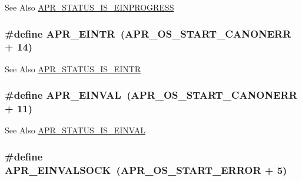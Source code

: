 \begin{DoxySeeAlso}{See Also}
\hyperlink{group___a_p_r___s_t_a_t_u_s___i_s_ga777e9ba36fe05ac8002113a9597073ea}{A\-P\-R\-\_\-\-S\-T\-A\-T\-U\-S\-\_\-\-I\-S\-\_\-\-E\-I\-N\-P\-R\-O\-G\-R\-E\-S\-S} 
\end{DoxySeeAlso}
\hypertarget{group___a_p_r___error_gaee1ce306c0ebf1701b34172310aa1bd5}{
\subsubsection[{A\-P\-R\-\_\-\-E\-I\-N\-T\-R}]{\setlength{\rightskip}{0pt plus 5cm}\#define A\-P\-R\-\_\-\-E\-I\-N\-T\-R~({\bf A\-P\-R\-\_\-\-O\-S\-\_\-\-S\-T\-A\-R\-T\-\_\-\-C\-A\-N\-O\-N\-E\-R\-R} + 14)}}\label{group___a_p_r___error_gaee1ce306c0ebf1701b34172310aa1bd5}
\begin{DoxySeeAlso}{See Also}
\hyperlink{group___a_p_r___s_t_a_t_u_s___i_s_ga30615baf6479221e44870c620e372b5b}{A\-P\-R\-\_\-\-S\-T\-A\-T\-U\-S\-\_\-\-I\-S\-\_\-\-E\-I\-N\-T\-R} 
\end{DoxySeeAlso}
\hypertarget{group___a_p_r___error_gae3ffc41994444e71ce522c036ca1d9a4}{
\subsubsection[{A\-P\-R\-\_\-\-E\-I\-N\-V\-A\-L}]{\setlength{\rightskip}{0pt plus 5cm}\#define A\-P\-R\-\_\-\-E\-I\-N\-V\-A\-L~({\bf A\-P\-R\-\_\-\-O\-S\-\_\-\-S\-T\-A\-R\-T\-\_\-\-C\-A\-N\-O\-N\-E\-R\-R} + 11)}}\label{group___a_p_r___error_gae3ffc41994444e71ce522c036ca1d9a4}
\begin{DoxySeeAlso}{See Also}
\hyperlink{group___a_p_r___s_t_a_t_u_s___i_s_ga3f620bb28c1c7f6fd3412dac2137d0fd}{A\-P\-R\-\_\-\-S\-T\-A\-T\-U\-S\-\_\-\-I\-S\-\_\-\-E\-I\-N\-V\-A\-L} 
\end{DoxySeeAlso}
\hypertarget{group___a_p_r___error_ga548032b79ce0671d9986db0654858812}{
\subsubsection[{A\-P\-R\-\_\-\-E\-I\-N\-V\-A\-L\-S\-O\-C\-K}]{\setlength{\rightskip}{0pt plus 5cm}\#define A\-P\-R\-\_\-\-E\-I\-N\-V\-A\-L\-S\-O\-C\-K~({\bf A\-P\-R\-\_\-\-O\-S\-\_\-\-S\-T\-A\-R\-T\-\_\-\-E\-R\-R\-O\-R} + 5)}}\label{group___a_p_r___error_ga548032b79ce0671d9986db0654858812}
